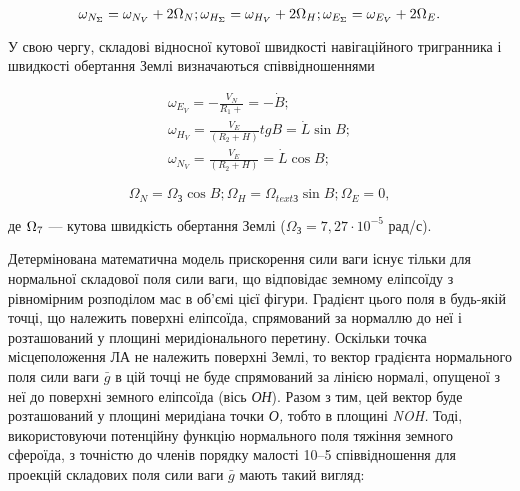 \[
\omega_{N_{\Sigma } } =\omega_{N_{V} } +2\Omega_{N} ;\\ 
\omega_{H_{\Sigma } } =\omega_{H_{V} } +2\Omega_{H} ;\\
\omega_{E_{\Sigma } } =\omega_{E_{V} } +2\Omega_{E} .
\] 

У свою чергу, складові відносної кутової швидкості навігаційного тригранника і швидкості 
обертання Землі визначаються співвідношеннями

\[
  \begin{array}{l} 
{\omega_{E_{V}} =-\frac{V_{N} }{R_{1} +} =-\dot{B};} \\ 
{\omega_{H_{V}} =\frac{V_{E}}{(R_{2} +H)} tgB=\dot{L}\sin B;} \\ 
{\omega_{N_{V}} =\frac{V_{E} }{(R_{2} +H)} =\dot{L}\cos B;} \end{array}\] 

\[
\Omega_{N} =\Omega_{\text{З}}\cos B;
\Omega_{H} =\Omega_{text{З}}\sin B; 
\Omega_{E} =0,
\] 

\begin{ESKDexplanation}
 \item де  $\Omega_{{\rm 7}} $ --- кутова швидкість обертання Землі ($\Omega_{\text{З}}=7,27 \cdot 10^{-5}$ рад/с).
\end{ESKDexplanation}



Детермінована математична модель прискорення сили ваги існує тільки для нормальної 
складової поля сили ваги, що відповідає земному еліпсоїду з рівномірним розподілом 
мас в об'ємі цієї фігури. Градієнт цього поля в будь-якій точці, що належить поверхні 
еліпсоїда, спрямований за нормаллю до неї і розташований у площині меридіонального 
перетину. Оскільки точка місцеположення ЛА не належить поверхні Землі, то вектор 
градієнта нормального поля сили ваги $\bar{g}$ в цій точці не буде спрямований за 
лінією нормалі, опущеної з неї до поверхні земного еліпсоїда (вісь \textit{ОН}). 
Разом з тим, цей вектор буде розташований у площині меридіана точки \textit{О, }тобто 
в площині \textit{NOH. }Тоді, використовуючи  потенційну функцію нормального поля 
тяжіння земного сфероїда, з точністю до членів порядку малості 10--5  співвідношення 
для проекцій складових поля сили ваги $\bar{g}$ мають такий вигляд:

